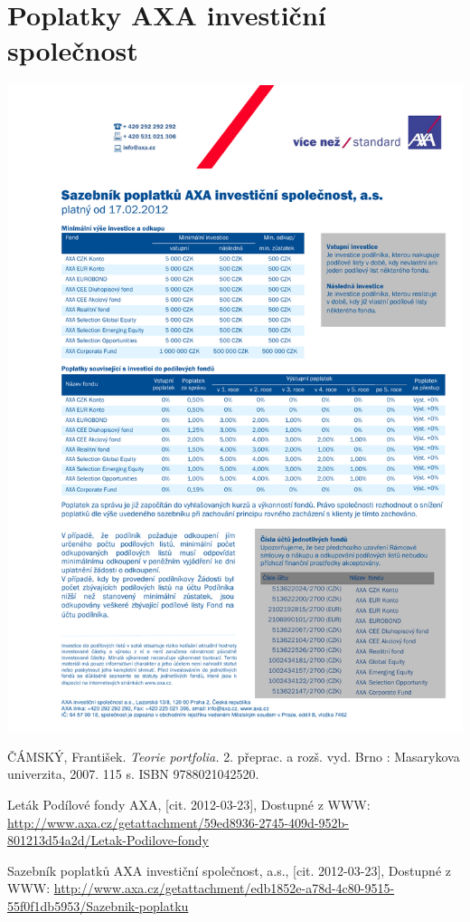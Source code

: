 \documentclass[a4paper,12pt]{article}
\begin{document}
\section{Poplatky AXA investiční společnost \cite{axa_cite}}
\label{axa}	
\includegraphics[width=1.0\textwidth]{axa.pdf}
\renewcommand{\bibname}{Seznam použité literatury}
\begin{thebibliography}{9}
\thispagestyle{plain}

 ČÁMSKÝ, František. \emph{Teorie portfolia.} 2. přeprac. a rozš. vyd. Brno : Masarykova univerzita, 2007. 115 s. ISBN 9788021042520.

Leták Podílové fondy AXA, [cit. 2012-03-23], Dostupné z WWW:  \url{http://www.axa.cz/getattachment/59ed8936-2745-409d-952b-801213d54a2d/Letak-Podilove-fondy}


Sazebník poplatků AXA investiční společnost, a.s., [cit. 2012-03-23], Dostupné z WWW:  \url{http://www.axa.cz/getattachment/edb1852e-a78d-4c80-9515-55f0f1db5953/Sazebnik-poplatku}
\end{thebibliography}
\end{document}
